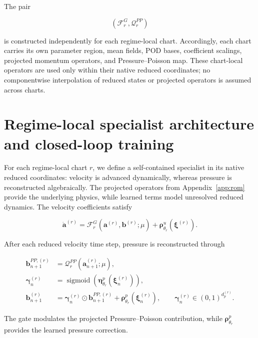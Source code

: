 \documentclass{article}
\begin{document}
The pair


\begin{equation}
    \left(
        \mathcal F_r^G,
        \mathcal Q_r^{PP}
    \right)
\end{equation}


is constructed independently for each regime-local chart.
Accordingly, each chart carries its own parameter region, mean fields,
POD bases, coefficient scalings, projected momentum operators, and
Pressure--Poisson map.
These chart-local operators are used only within their native reduced
coordinates; no componentwise interpolation of reduced states or projected
operators is assumed across charts.


\section{Regime-local specialist architecture and closed-loop training}
\label{app:specialists}

For each regime-local chart $r$, we define a self-contained 
specialist in its native reduced coordinates: velocity is advanced
dynamically, whereas pressure is reconstructed algebraically.
The projected operators from Appendix~\ref{app:rom} provide the underlying physics, while learned terms model unresolved reduced dynamics. The velocity coefficients satisfy


\begin{equation}
  \dot{\bm a}^{(r)}
  =
  \mathcal F_r^G
  \left(
    \bm a^{(r)},\bm b^{(r)};\mu
  \right)
  +
  \bm\rho^u_{\theta_r}
  \left(
    \bm\xi^{(r)}
  \right).
  \label{eq:app_hybrid_velocity_rhs}
\end{equation}


After each reduced velocity time step, pressure is reconstructed through


\begin{align}
  \bm b_{n+1}^{PP,(r)}
  &=
  \mathcal Q_r^{PP}
  \left(
    \bm a_{n+1}^{(r)};\mu
  \right),
  \nonumber\\
  \bm\gamma_n^{(r)}
  &=
  \operatorname{sigmoid}
  \left(
    \bm\eta^p_{\theta_r}
    (\bm\xi_n^{(r)})
  \right),
  \nonumber\\
  \bm b_{n+1}^{(r)}
  &=
  \bm\gamma_n^{(r)}
  \odot
  \bm b_{n+1}^{PP,(r)}
  +
  \bm\rho^p_{\theta_r}
  (\bm\xi_n^{(r)}),
  \qquad
  \bm\gamma_n^{(r)}
  \in(0,1)^{d_p^{(r)}}.
  \label{eq:app_pressure_closure}
\end{align}


The gate modulates the projected Pressure--Poisson contribution, while
$\bm\rho^p_{\theta_r}$ provides the learned pressure correction.
\end{document}
